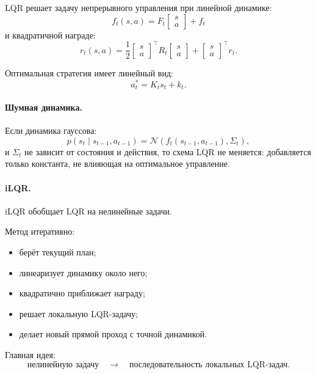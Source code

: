 \documentclass[12pt,a4paper]{article}
\begin{document}
LQR решает задачу непрерывного управления при линейной динамике:
\[
f_t(s,a)
=
F_t
\begin{bmatrix}
s\\
a
\end{bmatrix}
+
f_t
\]
и квадратичной награде:
\[
r_t(s,a)
=
\frac{1}{2}
\begin{bmatrix}
s\\
a
\end{bmatrix}^{\top}
R_t
\begin{bmatrix}
s\\
a
\end{bmatrix}
+
\begin{bmatrix}
s\\
a
\end{bmatrix}^{\top}
r_t.
\]

Оптимальная стратегия имеет линейный вид:
\[
a_t^\ast
=
K_ts_t+k_t.
\]

\paragraph{Шумная динамика.}

Если динамика гауссова:
\[
p(s_t\mid s_{t-1},a_{t-1})
=
\mathcal N(f_t(s_{t-1},a_{t-1}),\Sigma_t),
\]
и $\Sigma_t$ не зависит от состояния и действия, то схема LQR не меняется: добавляется только константа, не влияющая на оптимальное управление.

\paragraph{iLQR.}

iLQR обобщает LQR на нелинейные задачи.

Метод итеративно:
\begin{itemize}
    \item берёт текущий план;
    \item линеаризует динамику около него;
    \item квадратично приближает награду;
    \item решает локальную LQR-задачу;
    \item делает новый прямой проход с точной динамикой.
\end{itemize}

Главная идея:
\[
\text{нелинейную задачу}
\quad
\longrightarrow
\quad
\text{последовательность локальных LQR-задач}.
\]
\end{document}
